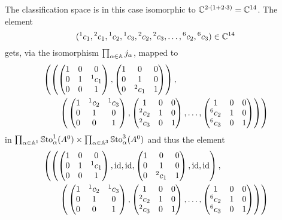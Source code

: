 The classification space is in this case isomorphic to
$\mathbb{C}^{2\cdot(1+2\cdot3)}=\mathbb{C}^{14}$.
The element
\[
  ({}^1c_1,{}^2c_1,
  {}^1c_2,{}^1c_3,{}^2c_2,{}^2c_3,\dots,{}^{6}c_2,{}^{6}c_3)
  \in\mathbb{C}^{14}
\]
gets, via the isomorphism $\prod_{\alpha\in\mathbb{A}}j_\alpha$, mapped to
\begin{align*}
  &\left(
  \left(
    \begin{pmatrix} 1 & 0 & 0 \\0 & 1 & {}^1c_1 \\0 & 0 & 1 \end{pmatrix},
    \begin{pmatrix} 1 & 0 & 0 \\0 & 1 & 0 \\0 & {}^2c_1 & 1 \end{pmatrix}
  \right),
  \right.
\\&\qquad\left(
  \left.
    \begin{pmatrix} 1 & {}^1c_2 & {}^1c_3 \\0 & 1 & 0 \\0 & 0 & 1 \end{pmatrix},
    \begin{pmatrix} 1 & 0 & 0 \\{}^2c_2 & 1 & 0 \\{}^2c_3 & 0 & 1 \end{pmatrix},
    \dots,
    \begin{pmatrix} 1 & 0 & 0 \\{}^{6}c_2 & 1 & 0 \\{}^{6}c_3 & 0 & 1 \end{pmatrix}
  \right)
  \right)
\end{align*}
in $\prod_{\alpha\in\mathbb{A}^{1}}\operatorname{\mathbb{S}to}_{\alpha}^{1}(A^0) \times
\prod_{\alpha\in\mathbb{A}^{3}}\operatorname{\mathbb{S}to}_{\alpha}^{3}(A^0)$ and thus the element
\begin{align*}
  &\left(
  \left(
    \begin{pmatrix} 1 & 0 & 0 \\0 & 1 & {}^1c_1 \\0 & 0 & 1 \end{pmatrix},
    \operatorname{id},\operatorname{id},
    \begin{pmatrix} 1 & 0 & 0 \\0 & 1 & 0 \\0 & {}^2c_1 & 1 \end{pmatrix},
    \operatorname{id},\operatorname{id}
  \right),
  \right.
\\&\qquad\left(
  \left.
    \begin{pmatrix} 1 & {}^1c_2 & {}^1c_3 \\0 & 1 & 0 \\0 & 0 & 1 \end{pmatrix},
    \begin{pmatrix} 1 & 0 & 0 \\{}^2c_2 & 1 & 0 \\{}^2c_3 & 0 & 1 \end{pmatrix},
    \dots,
    \begin{pmatrix} 1 & 0 & 0 \\{}^{6}c_2 & 1 & 0 \\{}^{6}c_3 & 0 & 1 \end{pmatrix}
  \right)
  \right)
\end{align*}
